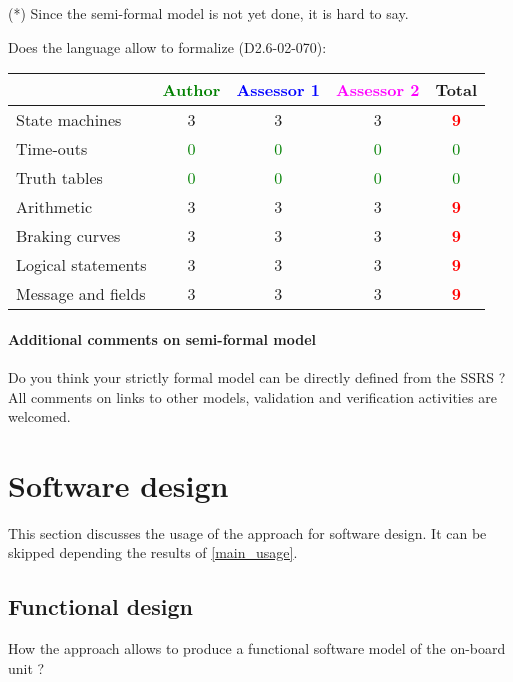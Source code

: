\begin{author_comment}
(*) Since the semi-formal model is not yet done, it is hard to say.
\end{author_comment}
Does the language allow to  formalize (D2.6-02-070):

\begin{tabular}{|l | c | c | c | c|}
\hline
& \textcolor{green}{Author} & \textcolor{blue}{Assessor 1} & \textcolor{magenta}{Assessor 2} & Total \\
\hline 
State machines  &3 &3 & 3    & \textcolor{red}{\textbf{9}} \\
\hline
Time-outs  & \textcolor{green}{0}   & \textcolor{green}{0}   & \textcolor{green}{0} & \textcolor{green}{0} \\
\hline
Truth tables  & \textcolor{green}{0}   & \textcolor{green}{0}   & \textcolor{green}{0} & \textcolor{green}{0} \\
\hline
Arithmetic  &3 &3 & 3   & \textcolor{red}{\textbf{9}} \\
\hline
Braking curves  &3 &3 & 3   & \textcolor{red}{\textbf{9}} \\
\hline
Logical statements &3 &3 & 3   & \textcolor{red}{\textbf{9}} \\
\hline
Message and fields &3 &3 & 3   & \textcolor{red}{\textbf{9}} \\
\hline
\end{tabular}

\paragraph{Additional comments on semi-formal  model} Do you think your strictly formal  model can be directly defined from the SSRS ?
All comments on links to  other models, validation and verification activities are welcomed.


\section{Software design}
This section discusses the usage of the approach for software design.
It can be skipped depending the results of \ref{main_usage}.

\subsection{Functional design}

How the approach allows to  produce a functional software model of the on-board unit ?

